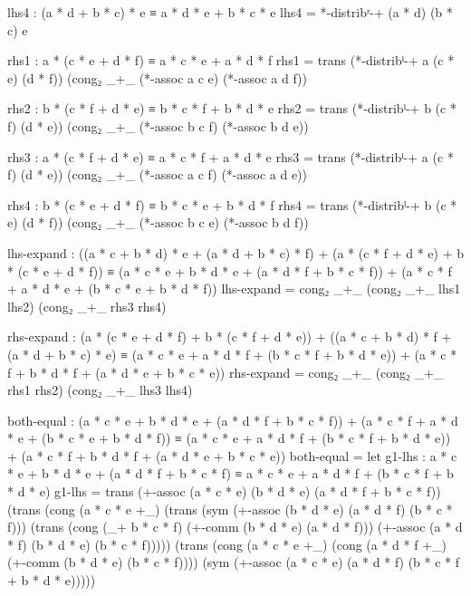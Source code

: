 \documentclass[11pt,a4paper]{book}
\begin{document}
\begin{code}
        lhs4 : (a * d + b * c) * e ≡ a * d * e + b * c * e
        lhs4 = *-distribʳ-+ (a * d) (b * c) e
        
        rhs1 : a * (c * e + d * f) ≡ a * c * e + a * d * f
        rhs1 = trans (*-distribˡ-+ a (c * e) (d * f)) (cong₂ _+_ (*-assoc a c e) (*-assoc a d f))
        
        rhs2 : b * (c * f + d * e) ≡ b * c * f + b * d * e
        rhs2 = trans (*-distribˡ-+ b (c * f) (d * e)) (cong₂ _+_ (*-assoc b c f) (*-assoc b d e))
        
        rhs3 : a * (c * f + d * e) ≡ a * c * f + a * d * e
        rhs3 = trans (*-distribˡ-+ a (c * f) (d * e)) (cong₂ _+_ (*-assoc a c f) (*-assoc a d e))

        
        rhs4 : b * (c * e + d * f) ≡ b * c * e + b * d * f
        rhs4 = trans (*-distribˡ-+ b (c * e) (d * f)) (cong₂ _+_ (*-assoc b c e) (*-assoc b d f))
        
        lhs-expand : ((a * c + b * d) * e + (a * d + b * c) * f) + (a * (c * f + d * e) + b * (c * e + d * f))
                   ≡ (a * c * e + b * d * e + (a * d * f + b * c * f)) + (a * c * f + a * d * e + (b * c * e + b * d * f))
        lhs-expand = cong₂ _+_ (cong₂ _+_ lhs1 lhs2) (cong₂ _+_ rhs3 rhs4)
        
        rhs-expand : (a * (c * e + d * f) + b * (c * f + d * e)) + ((a * c + b * d) * f + (a * d + b * c) * e)
                   ≡ (a * c * e + a * d * f + (b * c * f + b * d * e)) + (a * c * f + b * d * f + (a * d * e + b * c * e))
        rhs-expand = cong₂ _+_ (cong₂ _+_ rhs1 rhs2) (cong₂ _+_ lhs3 lhs4)
        
        both-equal : (a * c * e + b * d * e + (a * d * f + b * c * f)) + (a * c * f + a * d * e + (b * c * e + b * d * f))
                   ≡ (a * c * e + a * d * f + (b * c * f + b * d * e)) + (a * c * f + b * d * f + (a * d * e + b * c * e))
        both-equal = 
          let 
            g1-lhs : a * c * e + b * d * e + (a * d * f + b * c * f)
                   ≡ a * c * e + a * d * f + (b * c * f + b * d * e)
            g1-lhs = trans (+-assoc (a * c * e) (b * d * e) (a * d * f + b * c * f))
                     (trans (cong (a * c * e +_) (trans (sym (+-assoc (b * d * e) (a * d * f) (b * c * f)))
                            (trans (cong (_+ b * c * f) (+-comm (b * d * e) (a * d * f)))
                            (+-assoc (a * d * f) (b * d * e) (b * c * f)))))
                     (trans (cong (a * c * e +_) (cong (a * d * f +_) (+-comm (b * d * e) (b * c * f))))
                     (sym (+-assoc (a * c * e) (a * d * f) (b * c * f + b * d * e)))))
            

\end{code}
\end{document}
